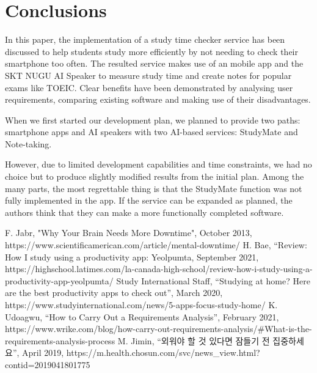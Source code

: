 \documentclass[conference]{IEEEtran}
\begin{document}
\section{Conclusions}

In this paper, the implementation of a study time checker service has been discussed to help students study more efficiently by not needing to check their smartphone too often. The resulted service makes use of an mobile app and the SKT NUGU AI Speaker to measure study time and create notes for popular exams like TOEIC. Clear benefits have been demonstrated by analysing user requirements, comparing existing software and making use of their disadvantages. 

When we first started our development plan, we planned to provide two paths: smartphone apps and AI speakers with two AI-based services: StudyMate and Note-taking.

However, due to limited development capabilities and time constraints, we had no choice but to produce slightly modified results from the initial plan. Among the many parts, the most regrettable thing is that the StudyMate function was not fully implemented in the app. If the service can be expanded as planned, the authors think that they can make a more functionally completed software.




\begin{thebibliography}{00}
 F. Jabr, "Why Your Brain Needs More Downtime", October 2013, https://www.scientificamerican.com/article/mental-downtime/
 H. Bae, “Review: How I study using a productivity app: Yeolpumta, September 2021, https://highschool.latimes.com/la-canada-high-school/review-how-i-study-using-a-productivity-app-yeolpumta/ 
 Study International Staff, “Studying at home? Here are the best productivity apps to check out”, March 2020, https://www.studyinternational.com/news/5-apps-focus-study-home/
 K. Udoagwu, “How to Carry Out a Requirements Analysis”, February 2021, https://www.wrike.com/blog/how-carry-out-requirements-analysis/\#What-is-the-requirements-analysis-process
 M. Jimin, “외워야 할 것 있다면 잠들기 전 집중하세요”, April 2019, https://m.health.chosun.com/svc/news\_view.html?contid=2019041801775

\end{thebibliography}
\vspace{12pt}
\end{document}
